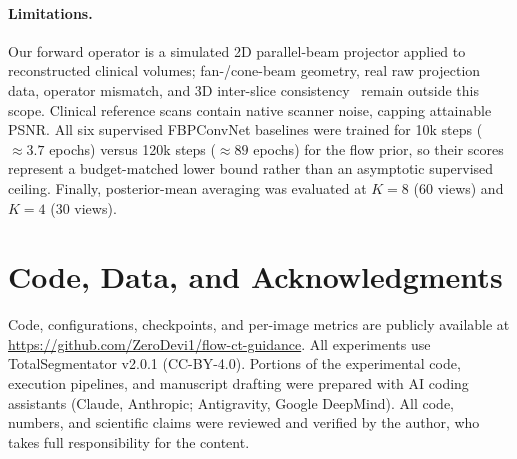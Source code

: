 \documentclass[11pt]{article}
\begin{document}
\paragraph{Limitations.}
Our forward operator is a simulated 2D parallel-beam projector applied to reconstructed clinical volumes; fan-/cone-beam geometry, real raw projection data, operator mismatch, and 3D inter-slice consistency~\cite{chung2023diffusionmbir,song2024diffusionblend} remain outside this scope. Clinical reference scans contain native scanner noise, capping attainable PSNR. All six supervised FBPConvNet baselines were trained for 10k steps ($\approx 3.7$ epochs) versus 120k steps ($\approx 89$ epochs) for the flow prior, so their scores represent a budget-matched lower bound rather than an asymptotic supervised ceiling. Finally, posterior-mean averaging was evaluated at $K{=}8$ (60 views) and $K{=}4$ (30 views).

\section*{Code, Data, and Acknowledgments}
Code, configurations, checkpoints, and per-image metrics are publicly available at \url{https://github.com/ZeroDevi1/flow-ct-guidance}. All experiments use TotalSegmentator v2.0.1 (CC-BY-4.0). Portions of the experimental code, execution pipelines, and manuscript drafting were prepared with AI coding assistants (Claude, Anthropic; Antigravity, Google DeepMind). All code, numbers, and scientific claims were reviewed and verified by the author, who takes full responsibility for the content.

\FloatBarrier
\appendix
\end{document}
